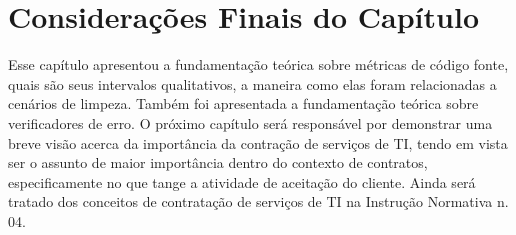 \section{Considerações Finais do Capítulo}  

Esse capítulo apresentou a fundamentação teórica sobre métricas de código fonte, quais são seus intervalos qualitativos, a maneira como elas foram relacionadas a cenários de limpeza. Também foi apresentada a fundamentação teórica sobre verificadores de erro. O próximo capítulo será responsável por demonstrar uma breve visão acerca da importância da contração de serviços de TI, tendo em vista ser o assunto de maior importância dentro do contexto de contratos, especificamente no que tange a atividade de aceitação do cliente. Ainda será tratado dos conceitos de contratação de serviços de TI na Instrução Normativa n. 04.
